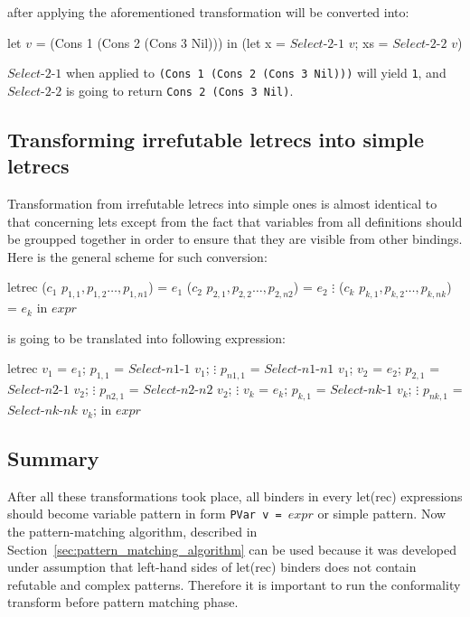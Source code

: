 \documentclass[12pt,a4paper]{report}
\begin{document}
after applying the aforementioned transformation will be converted into:

\vspace*{0.2in}
\begin{code}[style=haskell,mathescape=true]
let $v$ = (Cons 1 (Cons 2 (Cons 3 Nil)))
in (let x  = $Select\mbox{-}2\mbox{-}1$ $v$;
        xs = $Select\mbox{-}2\mbox{-}2$ $v$)
\end{code}

$Select\mbox{-}2\mbox{-}1$ when applied to \texttt{(Cons 1 (Cons 2 (Cons 3
Nil)))} will yield \texttt{1}, and $Select\mbox{-}2\mbox{-}2$ is going to return
\texttt{Cons 2 (Cons 3 Nil)}.

\subsection{Transforming irrefutable letrecs into simple letrecs}
Transformation from irrefutable letrecs into simple ones is almost
identical to that concerning lets except from the fact that variables
from all definitions should be groupped together in order to ensure that
they are visible from other bindings. Here is the general scheme for such
conversion:

\vspace*{0.2in}
\begin{code}[style=haskell,mathescape=true]
letrec ($c_1$ $p_{1,1}, p_{1,2} \ldots, p_{1,n1}$) = $e_1$
       ($c_2$ $p_{2,1}, p_{2,2} \ldots, p_{2,n2}$) = $e_2$
                $\vdots$
       ($c_k$ $p_{k,1}, p_{k,2} \ldots, p_{k,nk}$) = $e_k$
in $expr$
\end{code}

is going to be translated into following expression:

\vspace*{0.2in}
\begin{code}[style=haskell,mathescape=true]
letrec
    $v_1$ = $e_1$;
    $p_{1,1}$ = $Select\mbox{-}n1\mbox{-}1$ $v_1$;
              $\vdots$
    $p_{n1,1}$ = $Select\mbox{-}n1\mbox{-}n1$ $v_1$;
    $v_2$ = $e_2$;
    $p_{2,1}$ = $Select\mbox{-}n2\mbox{-}1$ $v_2$;
              $\vdots$
    $p_{n2,1}$ = $Select\mbox{-}n2\mbox{-}n2$ $v_2$;
              $\vdots$
    $v_k$ = $e_k$;
    $p_{k,1}$ = $Select\mbox{-}nk\mbox{-}1$ $v_k$;
              $\vdots$
    $p_{nk,1}$ = $Select\mbox{-}nk\mbox{-}nk$ $v_k$;
in $expr$
\end{code}

\subsection{Summary}
After all these transformations took place, all binders in every
let(rec) expressions should become variable pattern in form
\texttt{PVar v = $expr$} or simple pattern. Now the pattern-matching algorithm,
described in Section~\ref{sec:pattern_matching_algorithm} can be used because
it was developed under assumption that left-hand sides of let(rec)
binders does not contain refutable and complex patterns. Therefore it is
important to run the conformality transform before pattern matching phase.
\end{document}
